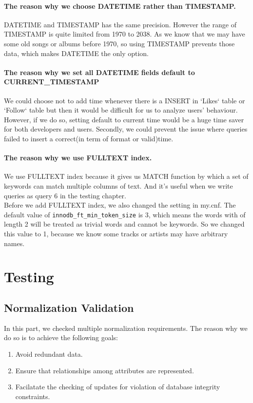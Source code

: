 \documentclass[letterpaper, 12pt]{report}
\begin{document}
	\subsubsection{The reason why we choose DATETIME rather than TIMESTAMP.}
	DATETIME and TIMESTAMP has the same precision. However the range of TIMESTAMP is quite limited from 1970 to 2038. As we know that we may have some old songs or albums before 1970, so using TIMESTAMP prevents those data, which makes DATETIME the only option.
	
	\subsubsection{The reason why we set all DATETIME fields default to CURRENT\_TIMESTAMP}
	We could choose not to add time whenever there is a INSERT in `Likes` table or `Follow` table but then it would be difficult for us to analyze users' behaviour. However, if we do so, setting default to current time would be a huge time saver for both developers and users. Secondly, we could prevent the issue where queries failed to insert a correct(in term of format or valid)time. 
	
	\subsubsection{The reason why we use FULLTEXT index.}
	We use FULLTEXT index because it gives us MATCH function by which a set of keywords can match multiple columns of text. And it's useful when we write queries as query 6 in the testing chapter.\\
	Before we add FULLTEXT index, we also changed the setting in my.cnf. The default value of \texttt{innodb\_ft\_min\_token\_size} is 3, which means the words with of length 2 will be treated as trivial words and cannot be keywords. So we changed this value to 1, because we know some tracks or artists may have arbitrary names.\\
	\chapter{Testing}
	
	\section{Normalization Validation}
	In this part, we checked multiple normalization requirements. The reason why we do so is to achieve the following goals:
	\begin{enumerate}
		\item 
		Avoid redundant data.
		\item 
		Ensure that relationships among attributes are represented.
		\item 
		Facilatate the checking of updates for violation of database integrity constraints.
	\end{enumerate}
\end{document}
